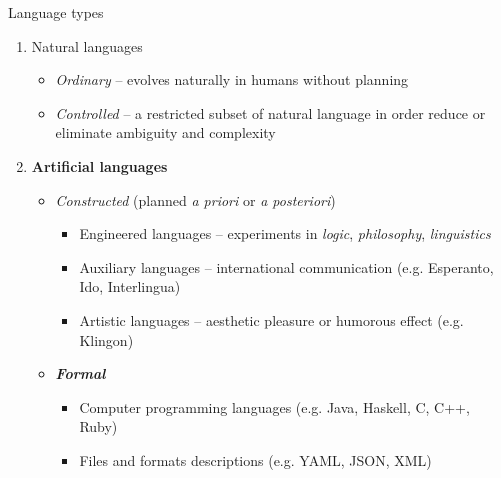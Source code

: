 \documentclass{beamer}
\begin{document}
\begin{frame}{Language types}
\begin{enumerate}
\item Natural languages
\begin{itemize}
\item \textit{Ordinary} -- evolves naturally in humans without planning
\item \textit{Controlled} -- a restricted subset of natural language in order reduce or eliminate ambiguity and complexity
\end{itemize}
\item \textbf{Artificial languages}
\begin{itemize}
\item \textit{Constructed} (planned \textit{a priori} or \textit{a posteriori})
\begin{itemize}
\item Engineered languages -- experiments in \textit{logic}, \textit{philosophy}, \textit{linguistics}
\item Auxiliary languages -- international communication (e.g. Esperanto, Ido,  Interlingua)
\item Artistic languages -- aesthetic pleasure or humorous effect (e.g. Klingon)
\end{itemize}
\item \textit{\textbf{Formal}}
\begin{itemize}
\item Computer programming languages (e.g. Java, Haskell, C, C++, Ruby)
\item Files and formats descriptions (e.g. YAML, JSON, XML)
\end{itemize}
\end{itemize}
\end{enumerate}
\end{frame}

\end{document}
